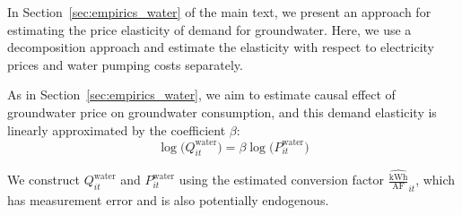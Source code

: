 In Section~\ref{sec:empirics_water} of the main text, we present an approach for estimating the price elasticity of demand for groundwater. Here, we use a decomposition approach and estimate the elasticity with respect to electricity prices and water pumping costs separately.

As in Section~\ref{sec:empirics_water}, we aim to estimate causal effect of groundwater price on groundwater consumption, and this demand elasticity is linearly approximated by the coefficient $\beta$:
\begin{equation}
\log\big(Q^{\text{water}}_{it}\big) = \beta \log\big({P}^{\text{water}}_{it}\big) \label{eq:elast_water}
\end{equation}


We construct $Q^{\text{water}}_{it}$ and $P^{\text{water}}_{it}$ 
using the estimated conversion factor $\widehat{\tfrac{{\text{kWh}}}{\text{AF}}}_{it}$, which has measurement error and is also potentially endogenous.




